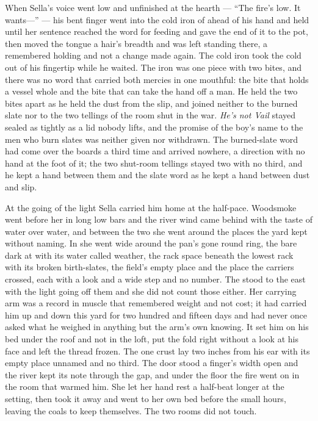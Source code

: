 When Sella's voice went low and unfinished at the hearth --- “The fire's low. It wants---” --- his bent finger went into the cold iron of  ahead of his hand and held until her sentence reached the word for feeding and gave the end of it to the pot, then moved the tongue a hair's breadth and was left standing there, a remembered holding and not a change made again. The cold iron took the cold out of his fingertip while he waited. The iron was one piece with two bites, and there was no  word that carried both mercies in one mouthful: the bite that holds a vessel whole and the bite that can take the hand off a man. He held the two bites apart as he held the dust from the slip, and joined neither to the burned slate nor to the two tellings of the room shut in the war. \emph{He's not Vail} stayed sealed as tightly as a lid nobody lifts, and the promise of the boy's name to the men who burn slates was neither given nor withdrawn. The burned-slate word had come over the boards a third time and arrived nowhere, a direction with no hand at the foot of it; the two shut-room tellings stayed two with no third, and he kept a hand between them and the slate word as he kept a hand between dust and slip.

\scenebreak

At the going of the light Sella carried him home at the half-pace. Woodsmoke went before her in long low bars and the river wind came behind with the taste of water over water, and between the two she went around the places the yard kept without naming. In  she went wide around the pan's gone round ring, the bare dark  at  with its water called weather, the rack space beneath the lowest rack with its broken birth-slates, the field's empty place and the place the carriers crossed, each with a look and a wide step and no number. The  stood to the east with the light going off them and she did not count those either. Her carrying arm was a record in muscle that remembered weight and not cost; it had carried him up and down this yard for two hundred and fifteen days and had never once asked what he weighed in anything but the arm's own knowing. It set him on his bed under the roof and not in the loft, put the fold right without a look at his face and left the thread frozen. The one crust lay two inches from his ear with its empty place unnamed and no third. The door stood a finger's width open and the river kept its note through the gap, and under the floor the fire went on in the room that warmed him. She let her hand rest a half-beat longer at the setting, then took it away and went to her own bed before the small hours, leaving the coals to keep themselves. The two rooms did not touch.

